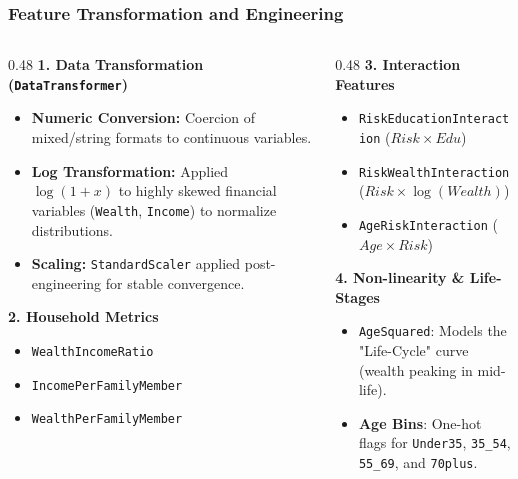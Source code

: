 \documentclass[aspectratio=169]{beamer}
\begin{document}
\begin{frame}
	\frametitle{Feature Transformation and Engineering}
	\begin{columns}[T]
		\begin{column}{0.48\textwidth}
			\textbf{1. Data Transformation (\texttt{DataTransformer})}
			\begin{itemize}
				\item \textbf{Numeric Conversion:} Coercion of mixed/string formats to continuous variables.
				\item \textbf{Log Transformation:} Applied $\log(1+x)$ to highly skewed financial variables (\texttt{Wealth}, \texttt{Income}) to normalize distributions.
				\item \textbf{Scaling:} \texttt{StandardScaler} applied post-engineering for stable convergence.
			\end{itemize}
			\vspace{0.3cm}
			\textbf{2. Household Metrics}
			\begin{itemize}
				\item \texttt{WealthIncomeRatio}
				\item \texttt{IncomePerFamilyMember}
				\item \texttt{WealthPerFamilyMember}
			\end{itemize}
		\end{column}
		\begin{column}{0.48\textwidth}
			\textbf{3. Interaction Features}
			\begin{itemize}
				\item \texttt{RiskEducationInteraction} ($Risk \times Edu$)
				\item \texttt{RiskWealthInteraction} ($Risk \times \log(Wealth)$)
				\item \texttt{AgeRiskInteraction} ($Age \times Risk$)
			\end{itemize}
			\vspace{0.3cm}
			\textbf{4. Non-linearity \& Life-Stages}
			\begin{itemize}
				\item \texttt{AgeSquared}: Models the "Life-Cycle" curve (wealth peaking in mid-life).
				\item \textbf{Age Bins}: One-hot flags for \texttt{Under35}, \texttt{35\_54}, \texttt{55\_69}, and \texttt{70plus}.
			\end{itemize}
		\end{column}
	\end{columns}
\end{frame}
\end{document}
